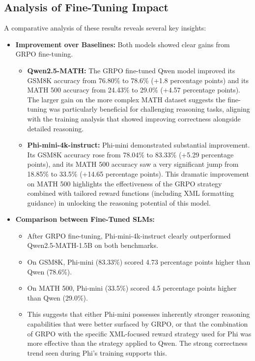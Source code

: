 \documentclass[11pt]{article}
\begin{document}
\begin{itemize}
\subsection{Analysis of Fine-Tuning Impact}

A comparative analysis of these results reveals several key insights:

\begin{itemize}
    \item \textbf{Improvement over Baselines:} Both models showed clear gains from GRPO fine-tuning.
        \begin{itemize}
            \item \textbf{Qwen2.5-MATH:} The GRPO fine-tuned Qwen model improved its GSM8K accuracy from 76.80\% to 78.6\% (+1.8 percentage points) and its MATH 500 accuracy from 24.43\% to 29.0\% (+4.57 percentage points). The larger gain on the more complex MATH dataset suggests the fine-tuning was particularly beneficial for challenging reasoning tasks, aligning with the training analysis that showed improving correctness alongside detailed reasoning.
            \item \textbf{Phi-mini-4k-instruct:} Phi-mini demonstrated substantial improvement. Its GSM8K accuracy rose from 78.04\% to 83.33\% (+5.29 percentage points), and its MATH 500 accuracy saw a very significant jump from 18.85\% to 33.5\% (+14.65 percentage points). This dramatic improvement on MATH 500 highlights the effectiveness of the GRPO strategy combined with tailored reward functions (including XML formatting guidance) in unlocking the reasoning potential of this model.
        \end{itemize}

    \item \textbf{Comparison between Fine-Tuned SLMs:}
        \begin{itemize}
            \item After GRPO fine-tuning, Phi-mini-4k-instruct clearly outperformed Qwen2.5-MATH-1.5B on both benchmarks.
            \item On GSM8K, Phi-mini (83.33\%) scored 4.73 percentage points higher than Qwen (78.6\%).
            \item On MATH 500, Phi-mini (33.5\%) scored 4.5 percentage points higher than Qwen (29.0\%).
            \item This suggests that either Phi-mini possesses inherently stronger reasoning capabilities that were better surfaced by GRPO, or that the combination of GRPO with the specific XML-focused reward strategy used for Phi was more effective than the strategy applied to Qwen. The strong correctness trend seen during Phi's training supports this.
        \end{itemize}


\end{itemize}
\end{itemize}
\end{document}
